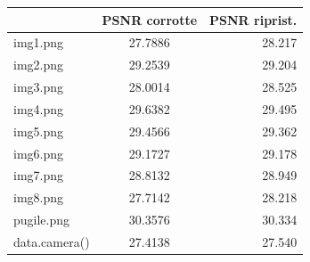 \begin{figure}[H]
    \centering
    \begin{minipage}{0.6\textwidth}\centering
        \begin{tabular}{|lcr|}
            \hline
            \rowcolor{orange}
            \multicolumn{1}{|c|}{\textbf{Immagine}} & \multicolumn{1}{l|}{\textbf{PSNR corrotte}} & \multicolumn{1}{c|}{\textbf{PSNR riprist.}} \\ \hline
            img1.png                                & 27.7886                                     & 28.217                                      \\
            img2.png                                & 29.2539                                     & 29.204                                      \\
            img3.png                                & 28.0014                                     & 28.525                                      \\
            img4.png                                & 29.6382                                     & 29.495                                      \\
            img5.png                                & 29.4566                                     & 29.362                                      \\
            img6.png                                & 29.1727                                     & 29.178                                      \\
            img7.png                                & 28.8132                                     & 28.949                                      \\
            img8.png                                & 27.7142                                     & 28.218                                      \\ \hline
            pugile.png                              & 30.3576                                     & 30.334                                      \\
            data.camera()                           & 27.4138                                     & 27.540                                      \\ \hline
            \end{tabular}
    \end{minipage}


\end{figure}
